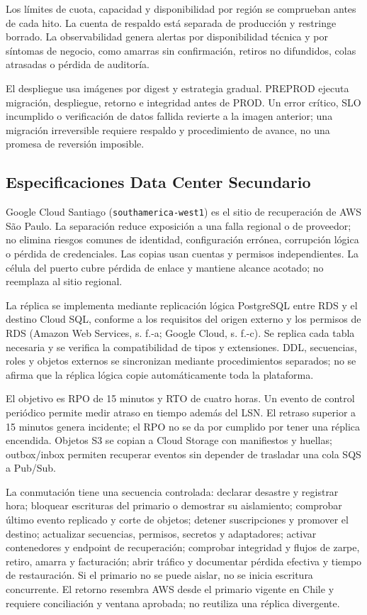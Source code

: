 \documentclass[11pt,letterpaper]{report}
\begin{document}
Los límites de cuota, capacidad y disponibilidad por región se comprueban antes de cada hito. La cuenta de respaldo está separada de producción y restringe borrado. La observabilidad genera alertas por disponibilidad técnica y por síntomas de negocio, como amarras sin confirmación, retiros no difundidos, colas atrasadas o pérdida de auditoría.

El despliegue usa imágenes por digest y estrategia gradual. PREPROD ejecuta migración, despliegue, retorno e integridad antes de PROD. Un error crítico, SLO incumplido o verificación de datos fallida revierte a la imagen anterior; una migración irreversible requiere respaldo y procedimiento de avance, no una promesa de reversión imposible.

\subsection{Especificaciones Data Center Secundario}

Google Cloud Santiago (\texttt{southamerica-west1}) es el sitio de recuperación de AWS São Paulo. La separación reduce exposición a una falla regional o de proveedor; no elimina riesgos comunes de identidad, configuración errónea, corrupción lógica o pérdida de credenciales. Las copias usan cuentas y permisos independientes. La célula del puerto cubre pérdida de enlace y mantiene alcance acotado; no reemplaza al sitio regional.

La réplica se implementa mediante replicación lógica PostgreSQL entre RDS y el destino Cloud SQL, conforme a los requisitos del origen externo y los permisos de RDS (Amazon Web Services, s. f.-a; Google Cloud, s. f.-c). Se replica cada tabla necesaria y se verifica la compatibilidad de tipos y extensiones. DDL, secuencias, roles y objetos externos se sincronizan mediante procedimientos separados; no se afirma que la réplica lógica copie automáticamente toda la plataforma.

El objetivo es RPO de 15 minutos y RTO de cuatro horas. Un evento de control periódico permite medir atraso en tiempo además del LSN. El retraso superior a 15 minutos genera incidente; el RPO no se da por cumplido por tener una réplica encendida. Objetos S3 se copian a Cloud Storage con manifiestos y huellas; outbox/inbox permiten recuperar eventos sin depender de trasladar una cola SQS a Pub/Sub.

La conmutación tiene una secuencia controlada: declarar desastre y registrar hora; bloquear escrituras del primario o demostrar su aislamiento; comprobar último evento replicado y corte de objetos; detener suscripciones y promover el destino; actualizar secuencias, permisos, secretos y adaptadores; activar contenedores y endpoint de recuperación; comprobar integridad y flujos de zarpe, retiro, amarra y facturación; abrir tráfico y documentar pérdida efectiva y tiempo de restauración. Si el primario no se puede aislar, no se inicia escritura concurrente. El retorno resembra AWS desde el primario vigente en Chile y requiere conciliación y ventana aprobada; no reutiliza una réplica divergente.
\end{document}
